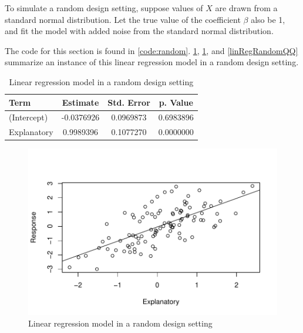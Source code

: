 \documentclass[nohyperref]{article}
\theoremstyle{plain}
\theoremstyle{definition}
\theoremstyle{remark}
\begin{document}
To simulate a random design setting, suppose values of $X$ are drawn from a standard normal distribution. Let the true value of the coefficient $\beta$ also be 1, and fit the model with added noise from the standard normal distribution.

The code for this section is found in \cref{code:random}. \cref{table:linRegRandomTable}, \cref{linRegRandom}, and \cref{linRegRandomQQ} summarize an instance of this linear regression model in a random design setting.

\begin{table}[!h]
\vskip 0.15in
\begin{center}
\begin{small}
\begin{sc}
\begin{tabular}{lccc}
\toprule
Term & Estimate & Std. Error & p. Value \\
\midrule
(Intercept) & -0.0376926 & 0.0969873 & 0.6983896 \\
Explanatory & 0.9989396 & 0.1077270 & 0.0000000 \\
\bottomrule
\end{tabular}
\end{sc}
\end{small}
\end{center}
\caption{Linear regression model in a random design setting}
\label{table:linRegRandomTable}
\vskip -0.1in
\end{table}


\begin{figure}[!h]
\vskip 0.2in
\begin{center}
\centerline{\includegraphics[width=\columnwidth]{randomReg.pdf}}
\caption{Linear regression model in a random design setting}
\label{linRegRandom}
\end{center}
\vskip -0.2in
\end{figure}
\end{document}
